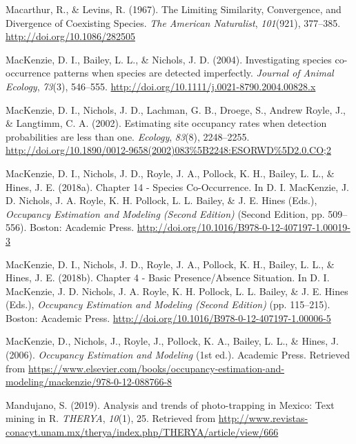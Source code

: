 \documentclass[12pt,twoside]{reedthesis}
\begin{document}
\leavevmode\hypertarget{ref-macarthur_limiting_1967}{}%
Macarthur, R., \& Levins, R. (1967). The Limiting Similarity, Convergence, and Divergence of Coexisting Species. \emph{The American Naturalist}, \emph{101}(921), 377--385. \url{http://doi.org/10.1086/282505}

\leavevmode\hypertarget{ref-mackenzie_investigating_2004}{}%
MacKenzie, D. I., Bailey, L. L., \& Nichols, J. D. (2004). Investigating species co-occurrence patterns when species are detected imperfectly. \emph{Journal of Animal Ecology}, \emph{73}(3), 546--555. \url{http://doi.org/10.1111/j.0021-8790.2004.00828.x}

\leavevmode\hypertarget{ref-mackenzie_estimating_2002-1}{}%
MacKenzie, D. I., Nichols, J. D., Lachman, G. B., Droege, S., Andrew Royle, J., \& Langtimm, C. A. (2002). Estimating site occupancy rates when detection probabilities are less than one. \emph{Ecology}, \emph{83}(8), 2248--2255. \url{http://doi.org/10.1890/0012-9658(2002)083\%5B2248:ESORWD\%5D2.0.CO;2}

\leavevmode\hypertarget{ref-mackenzie_chapter_2018-2}{}%
MacKenzie, D. I., Nichols, J. D., Royle, J. A., Pollock, K. H., Bailey, L. L., \& Hines, J. E. (2018a). Chapter 14 - Species Co-Occurrence. In D. I. MacKenzie, J. D. Nichols, J. A. Royle, K. H. Pollock, L. L. Bailey, \& J. E. Hines (Eds.), \emph{Occupancy Estimation and Modeling (Second Edition)} (Second Edition, pp. 509--556). Boston: Academic Press. \url{http://doi.org/10.1016/B978-0-12-407197-1.00019-3}

\leavevmode\hypertarget{ref-mackenzie_chapter_2018}{}%
MacKenzie, D. I., Nichols, J. D., Royle, J. A., Pollock, K. H., Bailey, L. L., \& Hines, J. E. (2018b). Chapter 4 - Basic Presence/Absence Situation. In D. I. MacKenzie, J. D. Nichols, J. A. Royle, K. H. Pollock, L. L. Bailey, \& J. E. Hines (Eds.), \emph{Occupancy Estimation and Modeling (Second Edition)} (pp. 115--215). Boston: Academic Press. \url{http://doi.org/10.1016/B978-0-12-407197-1.00006-5}

\leavevmode\hypertarget{ref-mackenzie_occupancy_2006}{}%
MacKenzie, D., Nichols, J., Royle, J., Pollock, K. A., Bailey, L. L., \& Hines, J. (2006). \emph{Occupancy Estimation and Modeling} (1st ed.). Academic Press. Retrieved from \url{https://www.elsevier.com/books/occupancy-estimation-and-modeling/mackenzie/978-0-12-088766-8}

\leavevmode\hypertarget{ref-mandujano_analysis_2019}{}%
Mandujano, S. (2019). Analysis and trends of photo-trapping in Mexico: Text mining in R. \emph{THERYA}, \emph{10}(1), 25. Retrieved from \url{http://www.revistas-conacyt.unam.mx/therya/index.php/THERYA/article/view/666}
\end{document}
